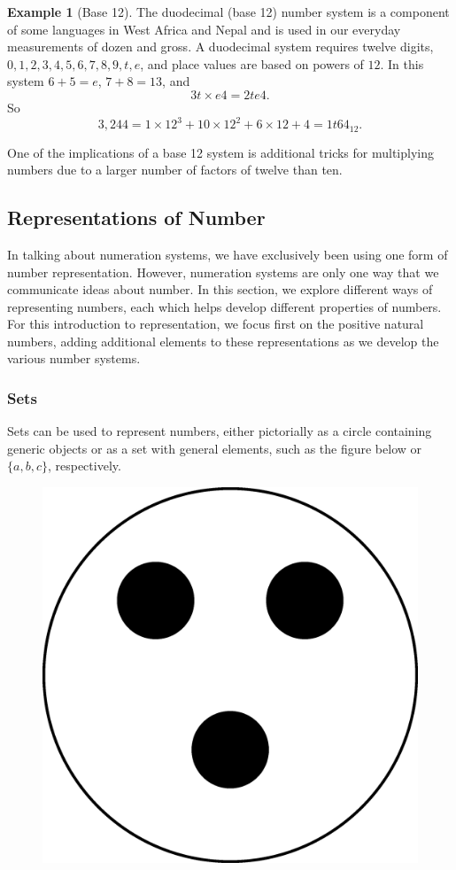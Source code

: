 \documentclass[
]{book}
\theoremstyle{definition}
\theoremstyle{definition}
\newtheorem{example}{Example}[chapter]
\theoremstyle{definition}
\theoremstyle{definition}
\theoremstyle{remark}
\begin{document}
\begin{example}[Base 12]
The duodecimal (base 12) number system is a component of some languages in West Africa and Nepal and is used in our everyday measurements of dozen and gross. A duodecimal system requires twelve digits, \(0,1,2,3,4,5,6,7,8,9,t,e\), and place values are based on powers of \(12\). In this system \(6+5=e\), \(7+8=13\), and
\[3t \times e4 = 2te4.\]
So \[3,244 = 1\times 12^3  + 10 \times 12^2 + 6 \times 12 + 4 = 1t64_{12}.\]

One of the implications of a base 12 system is additional tricks for multiplying numbers due to a larger number of factors of twelve than ten.
\end{example}

\hypertarget{representations-of-number}{%
\subsection{Representations of Number}\label{representations-of-number}}

In talking about numeration systems, we have exclusively been using one form of number representation. However, numeration systems are only one way that we communicate ideas about number. In this section, we explore different ways of representing numbers, each which helps develop different properties of numbers. For this introduction to representation, we focus first on the positive natural numbers, adding additional elements to these representations as we develop the various number systems.

\hypertarget{sets-1}{%
\subsubsection*{Sets}\label{sets-1}}

Sets can be used to represent numbers, either pictorially as a circle containing generic objects or as a set with general elements, such as the figure below or \(\{a,b,c\}\), respectively.

\begin{figure}

{\centering \includegraphics[width=0.2\linewidth]{tikz/Set-representations} 

}

\end{figure}
\end{document}
